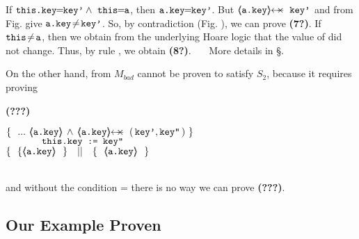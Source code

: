 \begin{example}
 \vspace{.03cm}
\noindent
If  $ \prg{this.key}\!\!=\!\!\prg{key'} \wedge\ \prg{this}\!\!=\!\!\prg{a}$, then $\mbox{\normalfont{\texttt{a.key}}}\!\!=\!\!\mbox{\normalfont{\texttt{key'}}}$. But   $\protectedFrom {\prg{a.key}} {\prg{key'}}$ and   %
 {} from Fig.  give $\mbox{\normalfont{\texttt{a.key}}}\!\neq\!\mbox{\normalfont{\texttt{key'}}}$. So,  by contradiction (\cf Fig. ), we can prove    \textbf{(7?)}.
If  $\mbox{\normalfont{\texttt{this}}}\!\neq \!\mbox{\normalfont{\texttt{a}}}$, then we  obtain from the underlying Hoare logic that the value of  did not change. Thus, by rule {}, we obtain  \textbf{(8?)}. \ \ \ More details in \S {}.
 
 \vspace{.045cm}
\noindent
On the other hand,  from $M_{bad}$ cannot be proven to satisfy $S_2$, because it %
requires  proving\\
\vspace{.03cm}
{\small{  \begin{minipage}{.05\textwidth}
   \textbf{(???)}\ \ 
\end{minipage}
\hfill
\begin{minipage}{.95\textwidth}
\begin{flushleft}
$\{ \  \   ...  \  {\inside{\prg{a.key}}} \, \wedge \, \protectedFrom {\prg{a.key}} { (\, \prg{key'},\prg{key''}\, )}  \   \} \ $\\
$\ \ \ \ \ \ \ \ \ \ \  \mbox{\normalfont{\texttt{this.key := key''}}}\   $\\
$  \{\  \    \{ {\inside{\prg{a.key}}}\   \   \}\ \ \  || \ \ \ \{  \ \  {\inside{\prg{a.key}}} \ \  \}  $ 
\end{flushleft}
\end{minipage}
}}
\\
and without the condition = there is no way we can prove \textbf{(???)}.

\subsection{Our Example Proven} %
\label{sect:example:proof:short}

\end{example}

 
